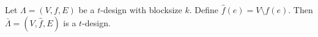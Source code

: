 Let $\Lambda = (V, f, E)$ be a $t$-design with blocksize $k$. Define $\hat{f}(e) = V \setminus f(e)$. Then $\bar{\Lambda} = (V, \hat{f}, E)$ is a $t$-design.
